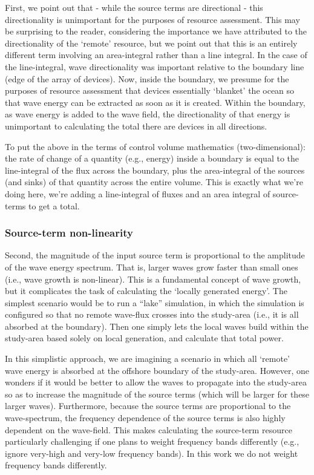 \documentclass[authoryear,preprint]{elsarticle}
\begin{document}
First, we point out that - while the source terms are directional - this directionality is unimportant for the purposes of resource assessment. This may be surprising to the reader, considering the importance we have attributed to the directionality of the ‘remote’ resource, but we point out that this is an entirely different term involving an area-integral rather than a line integral. In the case of the line-integral, wave directionality was important relative to the boundary line (edge of the array of devices). Now, inside the boundary, we presume for the purposes of resource assessment that devices essentially ‘blanket’ the ocean so that wave energy can be extracted as soon as it is created. Within the boundary, as wave energy is added to the wave field, the directionality of that energy is unimportant to calculating the total there are devices in all directions.

To put the above in the terms of control volume mathematics (two-dimensional): the rate of change of a quantity (e.g., energy) inside a boundary is equal to the line-integral of the flux across the boundary, plus the area-integral of the sources (and sinks) of that quantity across the entire volume. This is exactly what we’re doing here, we’re adding a line-integral of fluxes and an area integral of source-terms to get a total.

\subsubsection{Source-term non-linearity}

Second, the magnitude of the input source term is proportional to the amplitude of the wave energy spectrum. That is, larger waves grow faster than small ones (i.e., wave growth is non-linear). This is a fundamental concept of wave growth, but it complicates the task of calculating the ‘locally generated energy’. The simplest scenario would be to run a “lake” simulation, in which the simulation is configured so that no remote wave-flux crosses into the study-area (i.e., it is all absorbed at the boundary). Then one simply lets the local waves build within the study-area based solely on local generation, and calculate that total power.

In this simplistic approach, we are imagining a scenario in which all ‘remote’ wave energy is absorbed at the offshore boundary of the study-area. However, one wonders if it would be better to allow the waves to propagate into the study-area so as to increase the magnitude of the source terms (which will be larger for these larger waves). Furthermore, because the source terms are proportional to the wave-spectrum, the frequency dependence of the source terms is also highly dependent on the wave-field. This makes calculating the source-term resource particularly challenging if one plans to weight frequency bands differently (e.g., ignore very-high and very-low frequency bands). In this work we do not weight frequency bands differently.
\end{document}
